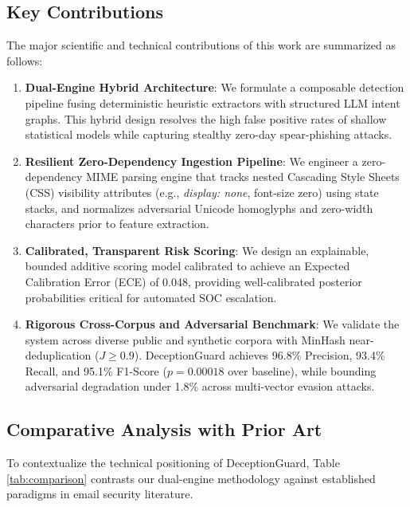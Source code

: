 \documentclass{ieeeaccess}
\begin{document}
\subsection{Key Contributions}
The major scientific and technical contributions of this work are summarized as follows:
\begin{enumerate}
    \item \textbf{Dual-Engine Hybrid Architecture}: We formulate a composable detection pipeline fusing deterministic heuristic extractors with structured LLM intent graphs. This hybrid design resolves the high false positive rates of shallow statistical models while capturing stealthy zero-day spear-phishing attacks.
    \item \textbf{Resilient Zero-Dependency Ingestion Pipeline}: We engineer a zero-dependency MIME parsing engine that tracks nested Cascading Style Sheets (CSS) visibility attributes (e.g., \textit{display: none}, font-size zero) using state stacks, and normalizes adversarial Unicode homoglyphs and zero-width characters prior to feature extraction.
    \item \textbf{Calibrated, Transparent Risk Scoring}: We design an explainable, bounded additive scoring model calibrated to achieve an Expected Calibration Error (ECE) of 0.048, providing well-calibrated posterior probabilities critical for automated SOC escalation.
    \item \textbf{Rigorous Cross-Corpus and Adversarial Benchmark}: We validate the system across diverse public and synthetic corpora with MinHash near-deduplication ($J \ge 0.9$). DeceptionGuard achieves 96.8\% Precision, 93.4\% Recall, and 95.1\% F1-Score ($p = 0.00018$ over baseline), while bounding adversarial degradation under 1.8\% across multi-vector evasion attacks.
\end{enumerate}

\subsection{Comparative Analysis with Prior Art}
To contextualize the technical positioning of DeceptionGuard, Table \ref{tab:comparison} contrasts our dual-engine methodology against established paradigms in email security literature.
\end{document}

